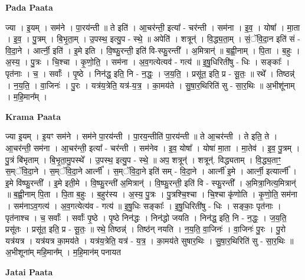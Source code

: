 \documentclass[17pt]{extarticle}
\begin{document}
\textbf{Pada Paata} \newline

ज्या । इ॒यम् । सम॑ने । पा॒रय॑न्ती ॥ ते इति॑ । आ॒चर॑न्ती॒ इत्या᳚ - चर॑न्ती । सम॑ना । इ॒व॒ । योषा᳚ । मा॒ता । इ॒व॒ । पु॒त्रम् । बि॒भृ॒ता॒म् । उ॒पस्थ॒ इत्यु॒प - स्थे॒ ॥ अपेति॑ । शत्रून्॑ । वि॒द्ध्य॒ता॒म् । सं॒ॅवि॒दा॒न इति॑ सं - वि॒दा॒ने । आर्त्नी॒ इति॑ । इ॒मे इति । वि॒ष्फु॒रन्ती॒ इति॑ वि-स्फु॒रन्ती᳚ । अ॒मित्रान्॑ ॥ ब॒ह्वी॒नाम् । पि॒ता । ब॒हुः । अ॒स्य॒ । पु॒त्रः । चि॒श्चा । कृ॒णो॒ति॒ । सम॑ना । अ॒व॒गत्येत्यव॑ - गत्य॑ ॥ इ॒षु॒धिरिती॑षु - धिः । सङ्काः᳚ । पृत॑नाः । च॒ । सर्वाः᳚ । पृ॒ष्ठे । निन॑द्ध॒ इति॒ नि - न॒द्धः॒ । ज॒य॒ति॒ । प्रसू॑त॒ इति॒ प्र - सू॒तः॒ ॥ रथे᳚ । तिष्ठन्न्॑ । न॒य॒ति॒ । वा॒जिनः॑ । पु॒रः । यत्र॑य॒त्रेति॒ यत्र॑-य॒त्र॒ । का॒मय॑ते । सु॒षा॒र॒थिरिति॑ सु - सा॒र॒थिः ॥ अ॒भीशू॑नाम् । म॒हि॒मान᳚म् ।  \newline


\textbf{Krama Paata} \newline

ज्या इ॒यम् । इ॒यꣳ सम॑ने । सम॑ने पा॒रय॑न्ती । पा॒रय॒न्तीति॑ पा॒रय॑न्ती ॥ ते आ॒चर॑न्ती । ते इति॒ ते । आ॒चर॑न्ती॒ सम॑ना । आ॒चर॑न्ती॒ इत्या᳚ - चर॑न्ती । सम॑नेव । इ॒व॒ योषा᳚ । योषा॑ मा॒ता । मा॒तेव॑ । इ॒व॒ पु॒त्रम् । पु॒त्रं बि॑भृताम् । बि॒भृ॒ता॒मु॒पस्थे᳚ । उ॒पस्थ॒ इत्यु॒प - स्थे॒ ॥ अप॒ शत्रून्॑ । शत्रून्॑. विद्ध्यताम् । वि॒द्ध्य॒ताꣳ॒॒ स॒म्ॅवि॒दा॒ने । स॒म्ॅवि॒दा॒ने आर्त्नी᳚ । स॒म्ॅवि॒दा॒ने इति॑ सम् - वि॒दा॒ने । आर्त्नी॑ इ॒मे । आर्त्नी॒ इत्यार्त्नी᳚ । इ॒मे वि॑ष्फु॒रन्ती᳚ । इ॒मे इती॒मे । वि॒ष्फु॒रन्ती॑ अ॒मित्रान्॑ । वि॒ष्फु॒रन्ती॒ इति॑ वि - स्फु॒रन्ती᳚ । अ॒मित्रा॒नित्य॒मित्रान्॑ ॥ ब॒ह्वी॒नाम् पि॒ता । पि॒ता ब॒हुः । ब॒हुर॑स्य । अ॒स्य॒ पु॒त्रः । पु॒त्रश्चि॒श्चा । चि॒श्चा कृ॑णोति । कृ॒णो॒ति॒ सम॑ना । सम॑नाऽव॒गत्य॑ । अ॒व॒गत्येत्य॑व - गत्य॑ ॥ इ॒षु॒धिः सङ्काः᳚ । इ॒षु॒धिरिती॑षु - धिः । सङ्काः॒ पृत॑नाः । पृत॑नाश्च । च॒ सर्वाः᳚ । सर्वाः᳚ पृ॒ष्ठे । पृ॒ष्ठे निन॑द्धः । निन॑द्धो जयति । निन॑द्ध॒ इति॒ नि - न॒द्धः॒ । ज॒य॒ति॒ प्रसू॑तः । प्रसू॑त॒ इति॒ प्र - सू॒तः॒ ॥ रथे॒ तिष्ठन्न्॑ । तिष्ठ॑न् नयति । न॒य॒ति॒ वा॒जिनः॑ । वा॒जिनः॑ पु॒रः । पु॒रो यत्र॑यत्र । यत्र॑यत्र का॒मय॑ते । यत्र॑य॒त्रेति॒ यत्र॑ - य॒त्र॒ । का॒मय॑ते सुषार॒थिः । सु॒षा॒र॒थिरिति॑ सु - सा॒र॒थिः ॥ अ॒भीशूना॑म् महि॒मान᳚म् । म॒हि॒मान॑म् पनायत \newline

\textbf{Jatai Paata} \newline
\end{document}
